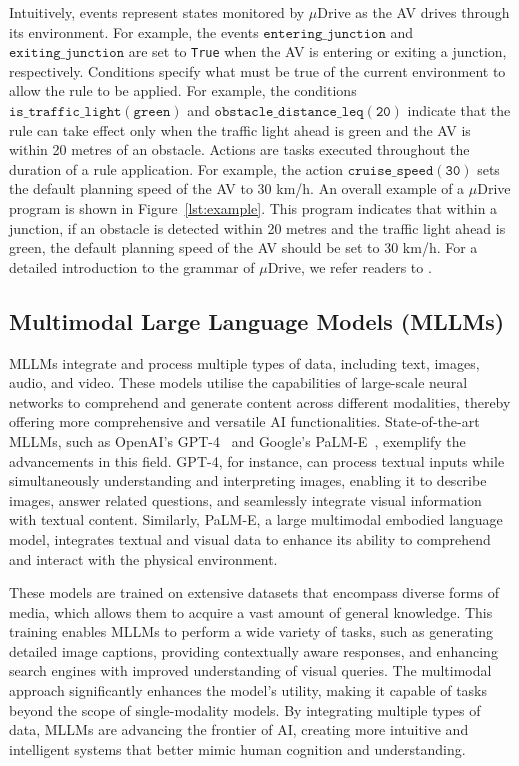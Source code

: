 Intuitively, events represent states monitored by $\mu$Drive as the AV drives through its environment. For example, the events $\mathtt{entering\_junction}$ and $\mathtt{exiting\_junction}$ are set to \texttt{True} when the AV is entering or exiting a junction, respectively.
Conditions specify what must be true of the current environment to allow the rule to be applied. For example, the conditions $\mathtt{is\_traffic\_light(green)}$ and $\mathtt{obstacle\_distance\_leq(20)}$ indicate that the rule can take effect only when the traffic light ahead is green and the AV is within 20 metres of an obstacle.
Actions are tasks executed throughout the duration of a rule application. For example, the action $\mathtt{cruise\_speed(30)}$ sets the default planning speed of the AV to 30 km/h.
An overall example of a $\mu$Drive program is shown in Figure~\ref{lst:example}. This program indicates that within a junction, if an obstacle is detected within 20 metres and the traffic light ahead is green, the default planning speed of the AV should be set to 30 km/h.
For a detailed introduction to the grammar of $\mu$Drive, we refer readers to \cite{wang2024mudrive}.

\subsection{Multimodal Large Language Models (MLLMs)}
MLLMs integrate and process multiple types of data, including text, images, audio, and video. These models utilise the capabilities of large-scale neural networks to comprehend and generate content across different modalities, thereby offering more comprehensive and versatile AI functionalities.
State-of-the-art MLLMs, such as OpenAI's GPT-4~\cite{openaichatgpt} and Google's PaLM-E~\cite{driess2023palm}, exemplify the advancements in this field. GPT-4, for instance, can process textual inputs while simultaneously understanding and interpreting images, enabling it to describe images, answer related questions, and seamlessly integrate visual information with textual content. Similarly, PaLM-E, a large multimodal embodied language model, integrates textual and visual data to enhance its ability to comprehend and interact with the physical environment.

These models are trained on extensive datasets that encompass diverse forms of media, which allows them to acquire a vast amount of general knowledge. This training enables MLLMs to perform a wide variety of tasks, such as generating detailed image captions, providing contextually aware responses, and enhancing search engines with improved understanding of visual queries.
The multimodal approach significantly enhances the model's utility, making it capable of tasks beyond the scope of single-modality models. By integrating multiple types of data, MLLMs are advancing the frontier of AI, creating more intuitive and intelligent systems that better mimic human cognition and understanding.

